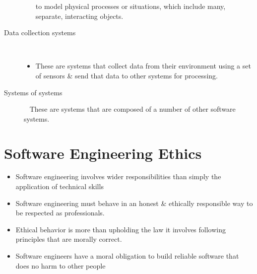 \documentclass{report}
\begin{document}
\begin{description}
\begin{itemize}
to model physical processes or situations, which include many,
separate, interacting objects.
  \end{itemize}
  \item [Data collection systems] \
  \begin{itemize}
    \item These are systems that collect data from their environment using a
set of sensors \& send that data to other systems for processing.
  \end{itemize}
  \item [Systems of systems] \ \newline
These are systems that are composed of a number of other software systems.
\end{description}

\section{Software Engineering Ethics}
\begin{itemize}
  \item Software engineering involves wider responsibilities than simply the application of technical skills
  \item Software engineering must behave in an honest \& ethically responsible way to be respected as professionals.
  \item Ethical behavior is more than upholding the law it involves following principles that are morally correct.
  \item Software engineers have a moral obligation to build reliable software that does no harm to other people
\end{itemize}
\end{document}
